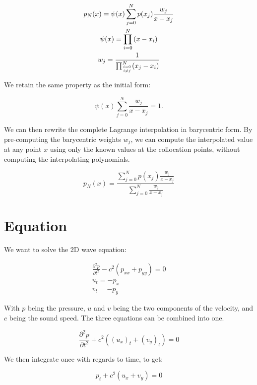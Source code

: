\begin{gather}
	p_N(x) = \psi(x)\sum_{j = 0}^{N}p(x_j)\frac{w_j}{x - x_j} \\
	\psi(x) = \prod_{i = 0}^{N}\left ( x - x_i \right ) \\
	w_j = \frac{1}{\prod_{\genfrac{}{}{0pt}{2}{i = 0}{i \neq j}}^{N}(x_j - x_i)}
\end{gather}

We retain the same property as the initial form:

\begin{equation}
	\psi(x)\sum_{j = 0}^{N}\frac{w_j}{x - x_j} = 1.
\end{equation}

We can then rewrite the complete Lagrange interpolation in barycentric form. By pre-computing the
barycentric weights $w_j$, we can compute the interpolated value at any point $x$ using only the
known values at the collocation points, without computing the interpolating polynomials. 

\begin{equation}
	p_N(x) = \frac{\sum_{j = 0}^{N} p(x_j)\frac{w_j}{x - x_j}}{\sum_{j = 0}^{N}\frac{w_j}{x - x_j}}
\end{equation}

\section{Equation} \label{section:spectral_element_method:equation}
We want to solve the 2D wave equation:

\begin{gather}
	\frac{\partial^2p}{\partial t^2} - c^2(p_{xx} + p_{yy}) = 0 \\
	u_t = - p_x \\
	v_t = -p_y
\end{gather}

With $p$ being the pressure, $u$ and $v$ being the two components of the velocity, and $c$ being the
sound speed. The three equations can be combined into one.

\begin{equation} \label{equ:2d_wave}
	\frac{\partial^2p}{\partial t^2} + c^2\left ( (u_x)_t + (v_y)_t \right ) = 0
\end{equation}

We then integrate once with regards to time, to get:

\begin{equation} \label{equ:2d_wave_integrated}
	p_t + c^2\left ( u_x + v_y \right ) = 0
\end{equation}

